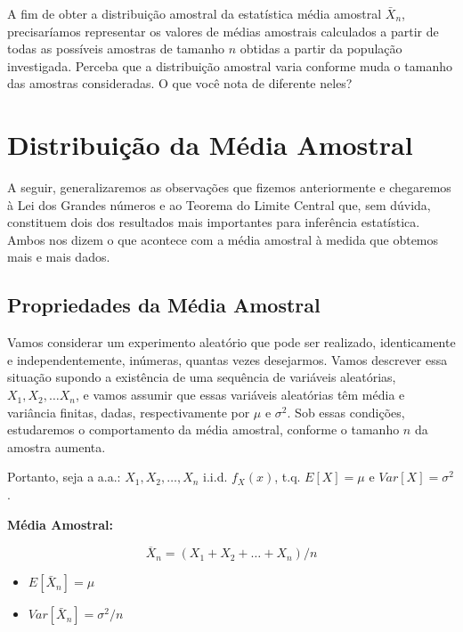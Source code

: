 \documentclass[
]{book}
\providecommand{\tightlist}{%
  \setlength{\itemsep}{0pt}\setlength{\parskip}{0pt}}
\theoremstyle{definition}
\theoremstyle{definition}
\theoremstyle{definition}
\theoremstyle{remark}
\begin{document}
A fim de obter a distribuição amostral da estatística média amostral \(\bar{X}_n\), precisaríamos representar os valores de médias amostrais calculados a partir de todas as possíveis amostras de tamanho \(n\) obtidas a partir da população investigada. Perceba que a distribuição amostral varia conforme muda o tamanho das amostras consideradas. O que você nota de diferente neles?

\hypertarget{distribuiuxe7uxe3o-da-muxe9dia-amostral}{%
\section{Distribuição da Média Amostral}\label{distribuiuxe7uxe3o-da-muxe9dia-amostral}}

A seguir, generalizaremos as observações que fizemos anteriormente e chegaremos à Lei dos Grandes números e ao Teorema do Limite Central que, sem dúvida, constituem dois dos resultados mais importantes para inferência estatística. Ambos nos dizem o que acontece com a média amostral à medida que obtemos mais e mais dados.

\hypertarget{propriedades-da-muxe9dia-amostral}{%
\subsection*{Propriedades da Média Amostral}\label{propriedades-da-muxe9dia-amostral}}

Vamos considerar um experimento aleatório que pode ser realizado, identicamente e independentemente, inúmeras, quantas vezes desejarmos. Vamos descrever essa situação supondo a existência de uma sequência de variáveis aleatórias, \(X_1, X_2, \ldots X_n\), e vamos assumir que essas variáveis aleatórias têm média e variância finitas, dadas, respectivamente por \(\mu\) e \(\sigma^2\). Sob essas condições, estudaremos o comportamento da média amostral, conforme o tamanho \(n\) da amostra aumenta.

Portanto, seja a a.a.: \(X_1, X_2, \ldots, X_n\) i.i.d. \(f_X(x)\), t.q. \(E[X] = \mu\) e \(Var[X] = \sigma^2\).

\textbf{Média Amostral:}

\[\overline{X}_n = (X_1 + X_2 + \ldots + X_n)/n\]

\begin{itemize}
\tightlist
\item
  \(E[\bar{X}_n] = \mu\)\\
\item
  \(Var[\bar{X}_n] = \sigma^2/n\)
\end{itemize}
\end{document}
